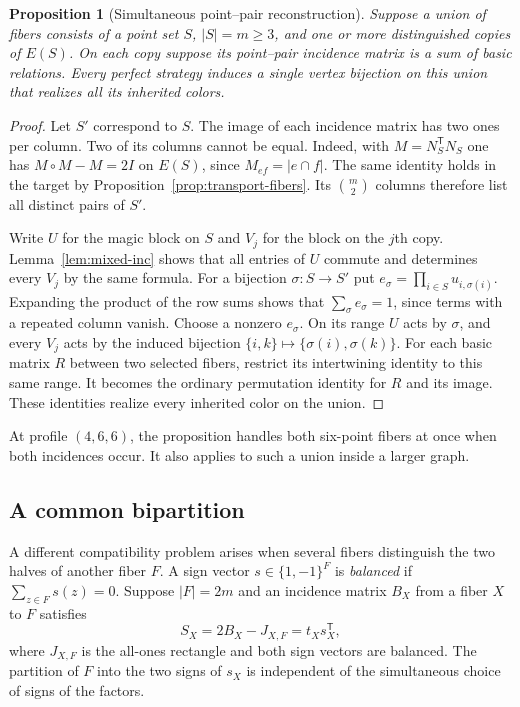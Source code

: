 \documentclass[11pt,reqno]{amsart}
\numberwithin{equation}{section}
\newtheorem{proposition}[theorem]{Proposition}
\theoremstyle{definition}
\begin{document}
\begin{proposition}[Simultaneous point--pair reconstruction]\label{prop:mixed-two-inc}
Suppose a union of fibers consists of a point set $S$, $|S|=m\ge3$, and one or more distinguished copies of $E(S)$. On each copy suppose its point--pair incidence matrix is a sum of basic relations. Every perfect strategy induces a single vertex bijection on this union that realizes all its inherited colors.
\end{proposition}
\begin{proof}
Let $S'$ correspond to $S$. The image of each incidence matrix has two ones per column. Two of its columns cannot be equal. Indeed, with $M=N_S^{\mathsf T}N_S$ one has $M\circ M-M=2I$ on $E(S)$, since $M_{ef}=|e\cap f|$. The same identity holds in the target by Proposition~\ref{prop:transport-fibers}. Its $\binom m2$ columns therefore list all distinct pairs of $S'$.

Write $U$ for the magic block on $S$ and $V_j$ for the block on the $j$th copy. Lemma~\ref{lem:mixed-inc} shows that all entries of $U$ commute and determines every $V_j$ by the same formula. For a bijection $\sigma:S\to S'$ put $e_\sigma=\prod_{i\in S}u_{i,\sigma(i)}$. Expanding the product of the row sums shows that $\sum_\sigma e_\sigma=1$, since terms with a repeated column vanish. Choose a nonzero $e_\sigma$. On its range $U$ acts by $\sigma$, and every $V_j$ acts by the induced bijection $\{i,k\}\mapsto\{\sigma(i),\sigma(k)\}$. For each basic matrix $R$ between two selected fibers, restrict its intertwining identity to this same range. It becomes the ordinary permutation identity for $R$ and its image. These identities realize every inherited color on the union.
\end{proof}
At profile $(4,6,6)$, the proposition handles both six-point fibers at once when both incidences occur. It also applies to such a union inside a larger graph.

\subsection{A common bipartition}
A different compatibility problem arises when several fibers distinguish the two halves of another fiber $F$. A sign vector $s\in\{1,-1\}^F$ is \emph{balanced} if $\sum_{z\in F}s(z)=0$. Suppose $|F|=2m$ and an incidence matrix $B_X$ from a fiber $X$ to $F$ satisfies
\[
                S_X=2B_X-J_{X,F}=t_Xs_X^{\mathsf T},
\]
where $J_{X,F}$ is the all-ones rectangle and both sign vectors are balanced. The partition of $F$ into the two signs of $s_X$ is independent of the simultaneous choice of signs of the factors.
\end{document}

